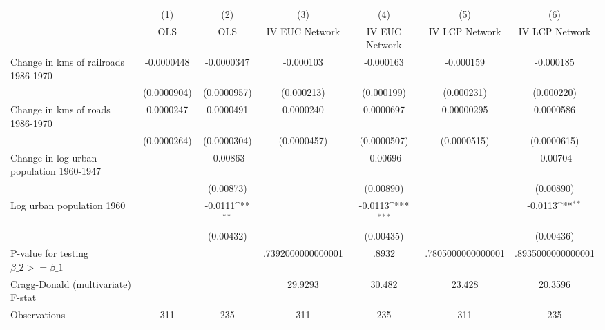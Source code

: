 {
\def\sym#1{\ifmmode^{#1}\else\(^{#1}\)\fi}
\begin{tabular}{l*{6}{c}}
\hline\hline
                &\multicolumn{1}{c}{(1)}&\multicolumn{1}{c}{(2)}&\multicolumn{1}{c}{(3)}&\multicolumn{1}{c}{(4)}&\multicolumn{1}{c}{(5)}&\multicolumn{1}{c}{(6)}\\
                &\multicolumn{1}{c}{OLS}&\multicolumn{1}{c}{OLS}&\multicolumn{1}{c}{IV EUC Network}&\multicolumn{1}{c}{IV EUC Network}&\multicolumn{1}{c}{IV LCP Network}&\multicolumn{1}{c}{IV LCP Network}\\
\hline
Change in kms of railroads 1986-1970&-0.0000448         &-0.0000347         &-0.000103         &-0.000163         &-0.000159         &-0.000185         \\
                &(0.0000904)         &(0.0000957)         &(0.000213)         &(0.000199)         &(0.000231)         &(0.000220)         \\
[1em]
Change in kms of roads 1986-1970&0.0000247         &0.0000491         &0.0000240         &0.0000697         &0.00000295         &0.0000586         \\
                &(0.0000264)         &(0.0000304)         &(0.0000457)         &(0.0000507)         &(0.0000515)         &(0.0000615)         \\
[1em]
Change in log urban population 1960-1947&                  & -0.00863         &                  & -0.00696         &                  & -0.00704         \\
                &                  &(0.00873)         &                  &(0.00890)         &                  &(0.00890)         \\
[1em]
Log urban population 1960&                  &  -0.0111\sym{**} &                  &  -0.0113\sym{***}&                  &  -0.0113\sym{**} \\
                &                  &(0.00432)         &                  &(0.00435)         &                  &(0.00436)         \\
\hline
P-value for testing $\beta\_{2} >= \beta\_{1}$&                  &                  &.7392000000000001         &    .8932         &.7805000000000001         &.8935000000000001         \\
Cragg-Donald (multivariate) F-stat&                  &                  &  29.9293         &   30.482         &   23.428         &  20.3596         \\
Observations    &      311         &      235         &      311         &      235         &      311         &      235         \\
\hline\hline
\end{tabular}
}
